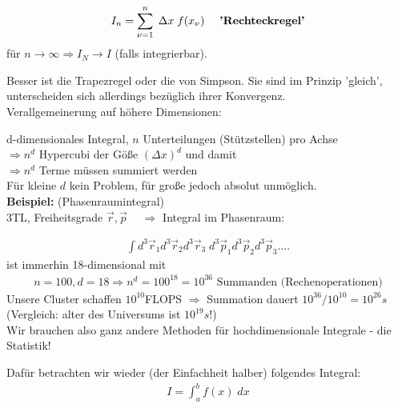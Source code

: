\documentclass[12pt]{article}
\begin{document}
\begin{align}
I_n= \sum_{\nu =1}^n \; \Delta x \; f(x_\nu) \quad \mbox{ \textbf{'Rechteckregel'}}
\end{align}
für $n \to \infty \Rightarrow I_N \to I$ (falls integrierbar).

Besser ist die Trapezregel oder die von Simpson. Sie sind im Prinzip 'gleich', unterscheiden sich allerdings bezüglich ihrer Konvergenz. \\

Verallgemeinerung auf höhere Dimensionen:

d-dimensionales Integral, $n$ Unterteilungen (Stützstellen) pro Achse \\
$\Rightarrow n^d$ Hypercubi der Göße $(\Delta x)^d$ und damit \\
$\Rightarrow n^d$ Terme müssen summiert werden\\
Für kleine $d$ kein Problem, für große jedoch absolut unmöglich. \\

\textbf{Beispiel:} (Phasenraumintegral) \\
 3TL, Freiheitsgrade $\vec{r}, \vec{p} \; \quad \Rightarrow$ Integral im Phasenraum: 

\begin{align*}
\int d^3 \vec{r}_1 d^3 \vec{r}_2 d^3 \vec{r}_3 \; d^3 \vec{p}_1 d^3 \vec{p}_2 d^3 \vec{p}_3 .... 
\end{align*} %
ist immerhin 18-dimensional mit 
\begin{align*}
 n=100, d=18 \Rightarrow n^d=100^{18}=10^{36} \mbox{ Summanden (Rechenoperationen)}
\end{align*} 
Unsere Cluster schaffen $10^{10}$FLOPS
$\Rightarrow$ Summation dauert $10^{36 } / 10^{10}= 10^{26}s$ \\ (Vergleich: alter des Universums ist $10^{19}s$!) \\
Wir brauchen also ganz andere Methoden für hochdimensionale Integrale - die Statistik! 

Dafür betrachten wir wieder (der Einfachheit halber) folgendes Integral:
\begin{align}
I= \int_a^b f(x) \; dx
\end{align}
\end{document}
